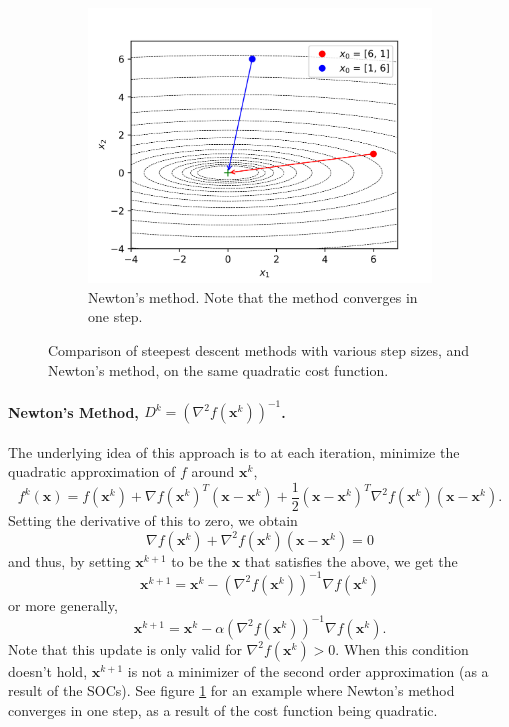 \begin{figure}[!t]
\begin{subfigure}[b]{0.46\linewidth}
        \centering
        \includegraphics[width=\textwidth]{figs/newtonmethod.png}
        \caption{Newton's method. Note that the method converges in one step.}
        \label{fig:graddesc_newton}
    \end{subfigure}
    \caption{Comparison of steepest descent methods with various step sizes, and Newton's method, on the same quadratic cost function.}
    \label{fig:gradient_descent}
\end{figure}

\paragraph{Newton's Method, $D^k = (\nabla^2 f(\bm{x}^k))^{-1}$.} The underlying idea of this approach is to at each iteration, minimize the quadratic approximation of $f$ around $\bm{x}^k$,
\begin{equation}
    f^k(\bm{x}) = f(\bm{x}^k) + \nabla f(\bm{x}^k)^T (\bm{x} - \bm{x}^k) + \frac{1}{2} (\bm{x} - \bm{x}^k)^T \nabla^2 f(\bm{x}^k) (\bm{x} - \bm{x}^k).
\end{equation}
Setting the derivative of this to zero, we obtain 
\begin{equation}
    \nabla f(\bm{x}^k) + \nabla^2 f(\bm{x}^k) (\bm{x} - \bm{x}^k) = 0
\end{equation}
and thus, by setting $\bm{x}^{k+1}$ to be the $\bm{x}$ that satisfies the above, we get the
\begin{equation}
    \bm{x}^{k+1} = \bm{x}^k - (\nabla^2 f(\bm{x}^k))^{-1} \nabla f(\bm{x}^k)
\end{equation}
or more generally, 
\begin{equation}
    \bm{x}^{k+1} = \bm{x}^k - \alpha (\nabla^2 f(\bm{x}^k))^{-1} \nabla f(\bm{x}^k).
\end{equation}
Note that this update is only valid for $\nabla^2 f(\bm{x}^k) > 0$. When this condition doesn't hold, $\bm{x}^{k+1}$ is not a minimizer of the second order approximation (as a result of the SOCs). See figure \ref{fig:graddesc_newton} for an example where Newton's method converges in one step, as a result of the cost function being quadratic. 

